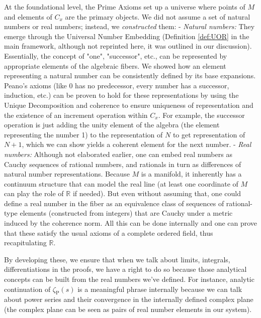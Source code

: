 \documentclass[11pt]{article}
\begin{document}
At the foundational level, the Prime Axioms set up a universe where points of $M$ and elements of $C_x$ are the primary objects. We did not assume a set of natural numbers or real numbers; instead, we \emph{constructed} them:
- \emph{Natural numbers:} They emerge through the Universal Number Embedding (Definition \ref{def:UOR} in the main framework, although not reprinted here, it was outlined in our discussion). Essentially, the concept of "one", "successor", etc., can be represented by appropriate elements of the algebraic fibers. We showed how an element representing a natural number can be consistently defined by its base expansions. Peano's axioms (like $0$ has no predecessor, every number has a successor, induction, etc.) can be proven to hold for these representations by using the Unique Decomposition and coherence to ensure uniqueness of representation and the existence of an increment operation within $C_x$. For example, the successor operation is just adding the unity element of the algebra (the element representing the number 1) to the representation of $N$ to get representation of $N+1$, which we can show yields a coherent element for the next number.
- \emph{Real numbers:} Although not elaborated earlier, one can embed real numbers as Cauchy sequences of rational numbers, and rationals in turn as differences of natural number representations. Because $M$ is a manifold, it inherently has a continuum structure that can model the real line (at least one coordinate of $M$ can play the role of $\mathbb{R}$ if needed). But even without assuming that, one could define a real number in the fiber as an equivalence class of sequences of rational-type elements (constructed from integers) that are Cauchy under a metric induced by the coherence norm. All this can be done internally and one can prove that these satisfy the usual axioms of a complete ordered field, thus recapitulating $\mathbb{R}$.

By developing these, we ensure that when we talk about limits, integrals, differentiations in the proofs, we have a right to do so because those analytical concepts can be built from the real numbers we've defined. For instance, analytic continuation of $\zeta_{\mathrm{P}}(s)$ is a meaningful phrase internally because we can talk about power series and their convergence in the internally defined complex plane (the complex plane can be seen as pairs of real number elements in our system).
\end{document}
